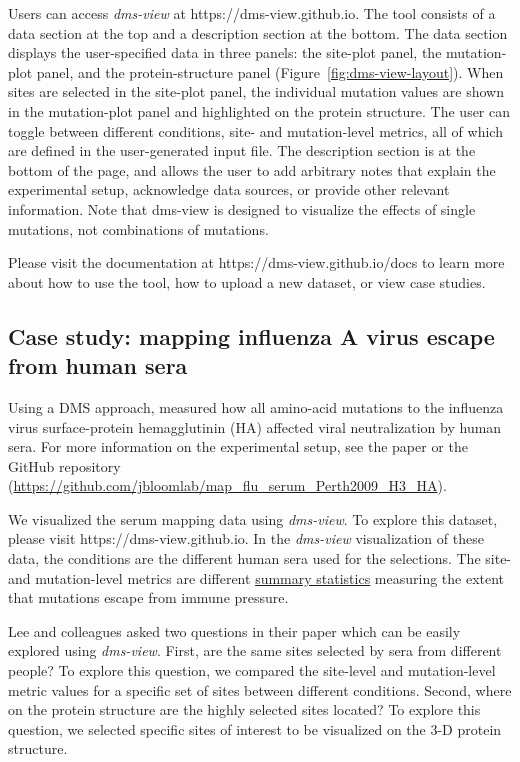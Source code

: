 Users can access \emph{dms-view} at https://dms-view.github.io.
The tool consists of a data section at the top and a description section at the bottom.
The data section displays the user-specified data in three panels: the site-plot panel, the mutation-plot panel, and the protein-structure panel (Figure~\ref{fig:dms-view-layout}).
When sites are selected in the site-plot panel, the individual mutation values are shown in the mutation-plot panel and highlighted on the protein structure.
The user can toggle between different conditions, site- and mutation-level metrics, all of which are defined in the user-generated input file.
The description section is at the bottom of the page, and allows the user to add arbitrary notes that explain the experimental setup, acknowledge data sources, or provide other relevant information.
Note that dms-view is designed to visualize the effects of single mutations, not combinations of mutations.

Please visit the documentation at https://dms-view.github.io/docs to learn more about how to use the tool, how to upload a new dataset, or view case studies.

\subsection{Case study: mapping influenza A virus escape from human sera}

Using a DMS approach, \citet{Lee2019} measured how all amino-acid mutations to the influenza virus surface-protein hemagglutinin (HA) affected viral neutralization by human sera.
For more information on the experimental setup, see the paper \citep{Lee2019} or the GitHub repository (\url{https://github.com/jbloomlab/map_flu_serum_Perth2009_H3_HA}).

We visualized the \citet{Lee2019} serum mapping data using \emph{dms-view}.
To explore this dataset, please visit https://dms-view.github.io.
In the \emph{dms-view} visualization of these data, the conditions are the different human sera used for the selections.
The site- and mutation-level metrics are different \href{https://jbloomlab.github.io/dms_tools2/diffsel.html}{summary statistics} measuring the extent that mutations escape from immune pressure.

Lee and colleagues asked two questions in their paper which can be easily explored using \emph{dms-view}.
First, are the same sites selected by sera from different people?
To explore this question, we compared the site-level and mutation-level metric values for a specific set of sites between different conditions.
Second, where on the protein structure are the highly selected sites located?
To explore this question, we selected specific sites of interest to be visualized on the 3-D protein structure.

